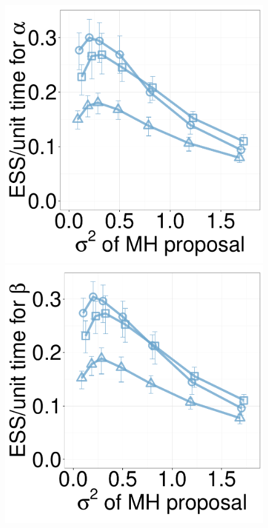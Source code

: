 \begin{figure}[H]
\begin{minipage}[hp]{0.24\linewidth}
	\end{minipage}
  \begin{minipage}[hp]{0.24\linewidth}
  \centering
    \includegraphics [width=0.99\textwidth, angle=0]{figs/new_whole_exp_figs/mh_cq_alpha_dim10.pdf}
	\end{minipage}
  \begin{minipage}[hp]{0.24\linewidth}
  \centering
    \includegraphics [width=0.99\textwidth, angle=0]{figs/new_whole_exp_figs/mh_cq_beta_dim10.pdf}

\end{minipage}
\end{figure}
